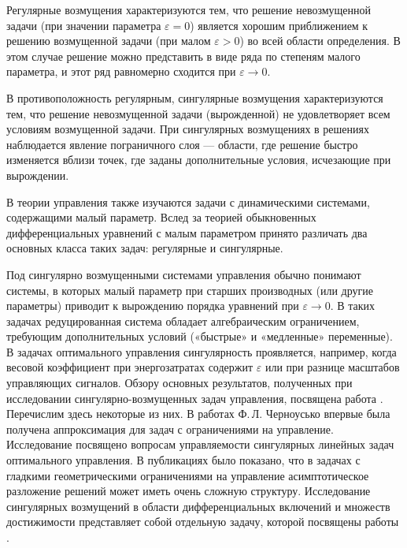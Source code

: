 \documentclass[../main.tex]{subfiles}
\begin{document}
Регулярные возмущения характеризуются тем, что решение невозмущенной задачи (при значении параметра $\varepsilon = 0$) является хорошим приближением к решению возмущенной задачи (при малом $\varepsilon > 0$) во всей области определения. 
В этом случае решение можно представить в виде ряда по степеням малого параметра, и этот ряд равномерно сходится при $\varepsilon \to 0$.

В противоположность регулярным, сингулярные возмущения характеризуются тем, что решение невозмущенной задачи (вырожденной) не удовлетворяет всем условиям возмущенной задачи. 
При сингулярных возмущениях в решениях наблюдается явление пограничного слоя --- области, где решение быстро изменяется вблизи точек, где заданы дополнительные условия, исчезающие при вырождении.

В теории управления также изучаются задачи с динамическими системами, содержащими малый параметр. 
Вслед за теорией обыкновенных дифференциальных уравнений с малым параметром принято различать два основных класса таких задач: регулярные и сингулярные. 

Под сингулярно возмущенными системами управления обычно понимают системы, в которых малый параметр при старших производных (или другие параметры) приводит к вырождению порядка уравнений при $\varepsilon\to0$. 
В таких задачах редуцированная система обладает алгебраическим ограничением, требующим дополнительных условий («быстрые» и «медленные» переменные). 
В задачах оптимального управления сингулярность проявляется, например, когда весовой коэффициент при энергозатратах содержит $\varepsilon$ или при разнице масштабов управляющих сигналов. 
Обзору основных результатов, полученных при исследовании сингулярно-возмущенных задач управления, посвящена работа \cite{Dmitriev}.
Перечислим здесь некоторые из них. 
В работах Ф.\,Л. Черноусько \cite{Chernousko1968, Chernousko1977} впервые была получена аппроксимация для задач с ограничениями на управление.
Исследование \cite{Kokotovic} посвящено вопросам управляемости сингулярных линейных задач оптимального управления.
В публикациях \cite{Ilyin1989, Ilyin1998} было показано, что в задачах с гладкими геометрическими ограничениями на управление асимптотическое разложение решений может иметь очень сложную структуру. 
Исследование сингулярных возмущений в области дифференциальных включений и множеств достижимости представляет собой отдельную задачу, которой посвящены работы \cite{FilippovaKurzhansky, Veliov, GONCHAROVAOVSEEVICH}.
\end{document}
